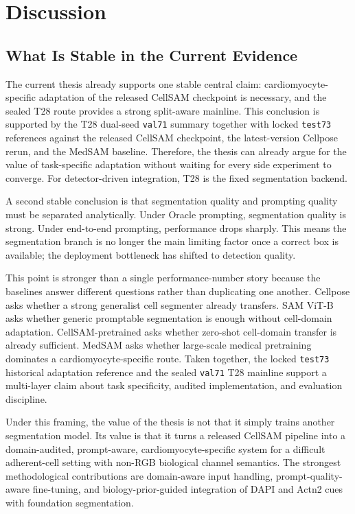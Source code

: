 \section{Discussion}\label{discussion}

\subsection{What Is Stable in the Current Evidence}\label{what-is-stable-in-the-current-evidence}

The current thesis already supports one stable central claim: cardiomyocyte-specific adaptation of the released CellSAM checkpoint is necessary, and the sealed T28 route provides a strong split-aware mainline. This conclusion is supported by the T28 dual-seed \texttt{val71} summary together with locked \texttt{test73} references against the released CellSAM checkpoint, the latest-version Cellpose rerun, and the MedSAM baseline. Therefore, the thesis can already argue for the value of task-specific adaptation without waiting for every side experiment to converge. For detector-driven integration, T28 is the fixed segmentation backend.

A second stable conclusion is that segmentation quality and prompting quality must be separated analytically. Under Oracle prompting, segmentation quality is strong. Under end-to-end prompting, performance drops sharply. This means the segmentation branch is no longer the main limiting factor once a correct box is available; the deployment bottleneck has shifted to detection quality.

This point is stronger than a single performance-number story because the baselines answer different questions rather than duplicating one another. Cellpose asks whether a strong generalist cell segmenter already transfers. SAM ViT-B asks whether generic promptable segmentation is enough without cell-domain adaptation. CellSAM-pretrained asks whether zero-shot cell-domain transfer is already sufficient. MedSAM asks whether large-scale medical pretraining dominates a cardiomyocyte-specific route. Taken together, the locked \texttt{test73} historical adaptation reference and the sealed \texttt{val71} T28 mainline support a multi-layer claim about task specificity, audited implementation, and evaluation discipline.

Under this framing, the value of the thesis is not that it simply trains another segmentation model. Its value is that it turns a released CellSAM pipeline into a domain-audited, prompt-aware, cardiomyocyte-specific system for a difficult adherent-cell setting with non-RGB biological channel semantics. The strongest methodological contributions are domain-aware input handling, prompt-quality-aware fine-tuning, and biology-prior-guided integration of DAPI and Actn2 cues with foundation segmentation.

